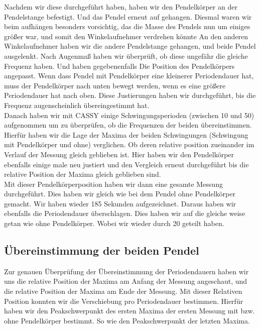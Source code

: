 \documentclass[twoside]{protokoll}
\begin{document}
Nachdem wir diese durchgeführt haben, haben wir den Pendelkörper an der Pendelstange befestigt. 
Und das Pendel erneut auf gehangen. 
Diesmal waren wir beim aufhängen besonders vorsichtig, das die Masse des Pendels nun um einiges größer war, und somit den Winkelaufnehmer verdrehen könnte
An den anderen Winkelaufnehmer haben wir die andere Pendelstange gehangen, und beide Pendel ausgelenkt.
Nach Augenmaß haben wir überprüft, ob diese ungefähr die gleiche Frequenz haben. Und haben gegebenenfalls Die Position des Pendelkörpers angepasst.
Wenn dass Pendel mit Pendelkörper eine kleinerer Periodendauer hat, muss der Pendelkörper nach unten bewegt werden, wenn es eine größere Periodendauer hat nach oben.
Diese Justierungen haben wir durchgeführt, bis die Frequenz augenscheinlich übereingestimmt hat. \\

Danach haben wir mit CASSY einige Schwingungsperioden (zwischen 10 und 50) aufgenommen um zu überprüfen, ob die Frequenzen der beiden übereinstimmen. 
Hierfür haben wir die Lage der Maxima der beiden Schwingungen (Schwingung mit Pendelkörper und ohne) verglichen.
Ob deren relative position zueinander im Verlauf der Messung gleich geblieben ist.
Hier haben wir den Pendelkörper ebenfalls einige male neu justiert und den Vergleich erneut durchgeführt bis die relative Position der Maxima gleich geblieben sind.\\

Mit dieser Pendelkörperposition haben wir dann eine gesamte Messung durchgeführt.
Dies haben wir gleich wie bei dem Pendel ohne Pendelkörper gemacht. Wir haben wieder 185 Sekunden aufgezeichnet. 
Daraus haben wir ebenfalls die Periodendauer überschlagen. 
Dies haben wir auf die gleiche weise getan wie ohne Pendelkörper. Wobei wir wieder durch 20 geteilt haben.

\subsection{Übereinstimmung der beiden Pendel}

Zur genauen Überprüfung der Übereinstimmung der Periodendauern haben wir uns die relative Position der Maxima am Anfang der Messung angeschaut, und die relative Position der Maxima am Ende der Messung. 
Mit dieser Relativen Position konnten wir die Verschiebung pro Periodendauer bestimmen.
Hierfür haben wir den Peakschwerpunkt des ersten Maxima der ersten Messung mit bzw. ohne Pendelkörper bestimmt. 
So wie den Peakschwerpunkt der letzten Maxima. 
\end{document}
